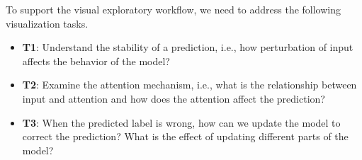 %
To support the visual exploratory workflow, we need to address the following visualization tasks.

\begin{itemize}

\item \textbf{T1}: Understand the stability of a prediction, i.e., how perturbation of input affects the behavior of the model?

\item \textbf{T2}: Examine the attention mechanism, i.e., what is the relationship between input and attention and how does the attention affect the prediction?

\item \textbf{T3}: When the predicted label is wrong, how can we update the model to correct the prediction? What is the effect of updating different parts of the model?




\end{itemize}

